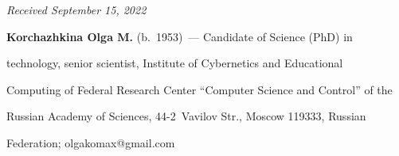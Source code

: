 \vspace*{-3pt}





\hfill{\small\textit{Received September 15, 2022}} 





\vspace*{-12pt} 





\Contrl





\vspace*{-4pt}





\noindent


\textbf{Korchazhkina Olga M.} (b.\ 1953)~--- Candidate of Science (PhD) in 


technology, senior scientist, Institute of Cybernetics and Educational 


Computing of Federal Research Center ``Computer Science and Control'' of the 


Russian Academy of Sciences, 44-2~Vavilov Str., Moscow 119333, Russian 


Federation; \mbox{olgakomax@gmail.com}





\label{end\stat}





\renewcommand{\bibname}{\protect\rm Литература} 


